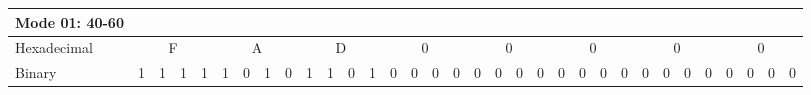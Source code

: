 \begin{table}[!htb]
{\begin{tabular}{lcccccccccccccccccccccccccccccccc}
\cellcolor[HTML]{9B9B9B}Mode 01: 40-60 & \multicolumn{1}{l}{} & \multicolumn{1}{l}{} & \multicolumn{1}{l}{} & \multicolumn{1}{l}{} & \multicolumn{1}{l}{} & \multicolumn{1}{l}{} & \multicolumn{1}{l}{} & \multicolumn{1}{l}{} & \multicolumn{1}{l}{} & \multicolumn{1}{l}{} & \multicolumn{1}{l}{} & \multicolumn{1}{l}{} & \multicolumn{1}{l}{} & \multicolumn{1}{l}{} & \multicolumn{1}{l}{} & \multicolumn{1}{l}{} & \multicolumn{1}{l}{} & \multicolumn{1}{l}{} & \multicolumn{1}{l}{} & \multicolumn{1}{l}{} & \multicolumn{1}{l}{} & \multicolumn{1}{l}{} & \multicolumn{1}{l}{} & \multicolumn{1}{l}{} & \multicolumn{1}{l}{} & \multicolumn{1}{l}{} & \multicolumn{1}{l}{} & \multicolumn{1}{l}{} & \multicolumn{1}{l}{} & \multicolumn{1}{l}{} & \multicolumn{1}{l}{} & \multicolumn{1}{l}{} \\ \hline
\multicolumn{1}{|l|}{Hexadecimal} & \multicolumn{4}{c|}{F} & \multicolumn{4}{c|}{A} & \multicolumn{4}{c|}{D} & \multicolumn{4}{c|}{0} & \multicolumn{4}{c|}{0} & \multicolumn{4}{c|}{0} & \multicolumn{4}{c|}{0} & \multicolumn{4}{c|}{0} \\ \hline
\multicolumn{1}{|l|}{Binary} & \multicolumn{1}{c|}{1} & \multicolumn{1}{c|}{1} & \multicolumn{1}{c|}{1} & \multicolumn{1}{c|}{1} & \multicolumn{1}{c|}{1} & \multicolumn{1}{c|}{0} & \multicolumn{1}{c|}{1} & \multicolumn{1}{c|}{0} & \multicolumn{1}{c|}{1} & \multicolumn{1}{c|}{1} & \multicolumn{1}{c|}{0} & \multicolumn{1}{c|}{1} & \multicolumn{1}{c|}{0} & \multicolumn{1}{c|}{0} & \multicolumn{1}{c|}{0} & \multicolumn{1}{c|}{0} & \multicolumn{1}{c|}{0} & \multicolumn{1}{c|}{0} & \multicolumn{1}{c|}{0} & \multicolumn{1}{c|}{0} & \multicolumn{1}{c|}{0} & \multicolumn{1}{c|}{0} & \multicolumn{1}{c|}{0} & \multicolumn{1}{c|}{0} & \multicolumn{1}{c|}{0} & \multicolumn{1}{c|}{0} & \multicolumn{1}{c|}{0} & \multicolumn{1}{c|}{0} & \multicolumn{1}{c|}{0} & \multicolumn{1}{c|}{0} & \multicolumn{1}{c|}{0} & \multicolumn{1}{c|}{0} \\ \hline

\end{tabular}}
\end{table}
